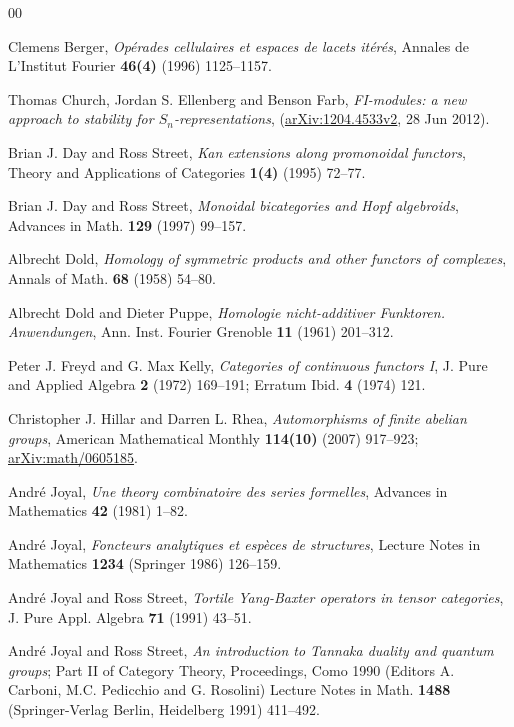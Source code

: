 \documentclass[a4paper,12pt,reqno]{amsart}
\theoremstyle{definition}
\theoremstyle{fact}
\theoremstyle{genquest}
\theoremstyle{step}
\begin{document}
\begin{thebibliography}{00}

 Clemens Berger, \textit{Op\'erades cellulaires et espaces de lacets it\'er\'es}, Annales de L'Institut Fourier \textbf{46(4)} (1996) 1125--1157.\label{Berger1996} 

 Thomas Church, Jordan S. Ellenberg and Benson Farb, \textit{FI-modules: a new approach to stability for $S_n$-representations}, (\url{arXiv:1204.4533v2}, 28 Jun 2012).\label{CEF2012}

 Brian J. Day and Ross Street, \textit{Kan extensions along promonoidal functors}, Theory and Applications of Categories \textbf{1(4)} (1995) 72--77. \label{DaySt1995} 

 Brian J. Day and Ross Street, \textit{Monoidal bicategories and Hopf algebroids}, Advances in Math. \textbf{129} (1997) 99--157. \label{DaySt1997}

 Albrecht Dold, \textit{Homology of symmetric products and other functors of complexes}, Annals of Math. \textbf{68} (1958) 54--80.\label{Dold}
 
 Albrecht Dold and Dieter Puppe, \textit{Homologie nicht-additiver Funktoren. Anwendungen}, Ann. Inst. Fourier Grenoble \textbf{11} (1961) 201--312.\label{DoldPuppe}

 Peter J. Freyd and G. Max Kelly, \textit{Categories of continuous functors I}, J. Pure and Applied Algebra \textbf{2} (1972) 169--191; Erratum Ibid. \textbf{4} (1974) 121.\label{FreydKelly}

 Christopher J. Hillar and Darren L. Rhea, \textit{Automorphisms of finite abelian groups}, American Mathematical Monthly \textbf{114(10)} (2007) 917--923; \url{arXiv:math/0605185}.\label{HillarDarren2007}

 Andr\'e Joyal, \textit{Une theory combinatoire des series formelles}, Advances in Mathematics \textbf{42} (1981) 1--82.\label{Species}

 Andr\'e Joyal, \textit{Foncteurs analytiques et esp\`eces de structures}, Lecture Notes in Mathematics \textbf{1234} (Springer 1986) 126--159.\label{AnalFunct} 

 Andr\'e Joyal and Ross Street, \textit{Tortile Yang-Baxter operators in tensor categories}, J. Pure Appl. Algebra \textbf{71} (1991) 43--51.\label{TYBO}

 Andr\'e Joyal and Ross Street, \textit{An introduction to Tannaka duality and quantum groups}; Part II of Category Theory, Proceedings, Como 1990 (Editors A. Carboni, M.C. Pedicchio and G. Rosolini) Lecture Notes in Math. \textbf{1488} (Springer-Verlag Berlin, Heidelberg 1991) 411--492.\label{ITD&QG}


\end{thebibliography}
\end{document}

